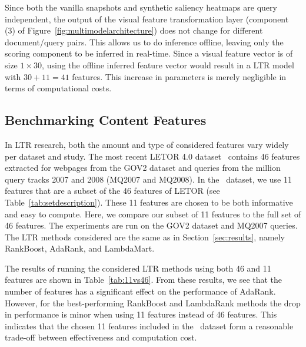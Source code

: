 Since both the vanilla snapshots and synthetic saliency heat\-maps are query independent, the output of the visual feature transformation layer (component (3) of Figure~\ref{fig:multimodelarchitecture}) does not change for different document/query pairs. This allows us to do inference offline, leaving only the scoring component to be inferred in real-time.
Since a visual feature vector is of size $1\times30$, using the offline inferred feature vector would result in a \ac{LTR} model with $30 + 11 = 41$ features. This increase in parameters is merely negligible in terms of computational costs.


\subsection{Benchmarking Content Features} \label{sec:contentfeatures}
In \ac{LTR} research, both the amount and type of considered features vary widely per dataset and study.
The most recent LETOR 4.0 dataset~\cite{Qin2013:Introducing} contains 46 features extracted for webpages from the GOV2 dataset and queries from the million query tracks 2007 and 2008 (MQ2007 and MQ2008).
In the \datasetname~dataset, we use 11 features that are a subset of the 46 features of LETOR (see Table~\ref{tab:setdescription}).
These 11 features are chosen to be both informative and easy to compute.
Here, we compare our subset of 11 features to the full set of 46 features.
The experiments are run on the GOV2 dataset and MQ2007 queries.
The \ac{LTR} methods considered are the same as in Section~\ref{sec:results}, namely RankBoost, AdaRank, and LambdaMart.

The results of running the considered \ac{LTR} methods using both 46 and 11 features are shown in Table~\ref{tab:11vs46}.
From these results, we see that the number of features has a significant effect on the performance of AdaRank.
However, for the best-performing RankBoost and LambdaRank methods the drop in performance is minor when using 11 features instead of 46 features.
This indicates that the chosen 11 features included in the \datasetname~dataset form a reasonable trade-off between effectiveness and computation cost.

